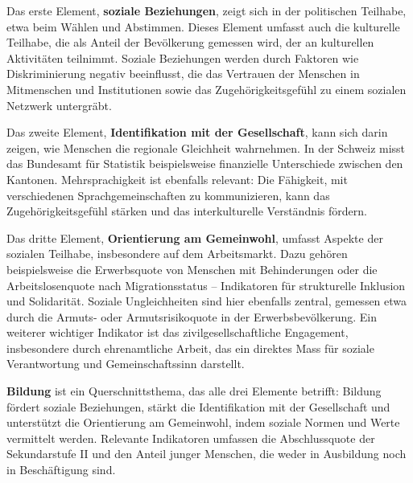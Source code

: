 \documentclass[
  nswissgerman,
  a4paper,
  DIV=11,
  numbers=noendperiod,
  oneside,
  openany]{scrreprt}
\begin{document}
Das erste Element, \textbf{soziale Beziehungen}, zeigt sich in der
politischen Teilhabe, etwa beim Wählen und Abstimmen. Dieses Element
umfasst auch die kulturelle Teilhabe, die als Anteil der Bevölkerung
gemessen wird, der an kulturellen Aktivitäten teilnimmt. Soziale
Beziehungen werden durch Faktoren wie Diskriminierung negativ
beeinflusst, die das Vertrauen der Menschen in Mitmenschen und
Institutionen sowie das Zugehörigkeitsgefühl zu einem sozialen Netzwerk
untergräbt.

Das zweite Element, \textbf{Identifikation mit der Gesellschaft}, kann
sich darin zeigen, wie Menschen die regionale Gleichheit wahrnehmen. In
der Schweiz misst das Bundesamt für Statistik beispielsweise finanzielle
Unterschiede zwischen den Kantonen. Mehrsprachigkeit ist ebenfalls
relevant: Die Fähigkeit, mit verschiedenen Sprachgemeinschaften zu
kommunizieren, kann das Zugehörigkeitsgefühl stärken und das
interkulturelle Verständnis fördern.

Das dritte Element, \textbf{Orientierung am Gemeinwohl}, umfasst Aspekte
der sozialen Teilhabe, insbesondere auf dem Arbeitsmarkt. Dazu gehören
beispielsweise die Erwerbsquote von Menschen mit Behinderungen oder die
Arbeitslosenquote nach Migrationsstatus -- Indikatoren für strukturelle
Inklusion und Solidarität. Soziale Ungleichheiten sind hier ebenfalls
zentral, gemessen etwa durch die Armuts- oder Armutsrisikoquote in der
Erwerbsbevölkerung. Ein weiterer wichtiger Indikator ist das
zivilgesellschaftliche Engagement, insbesondere durch ehrenamtliche
Arbeit, das ein direktes Mass für soziale Verantwortung und
Gemeinschaftssinn darstellt.

\textbf{Bildung} ist ein Querschnittsthema, das alle drei Elemente
betrifft: Bildung fördert soziale Beziehungen, stärkt die Identifikation
mit der Gesellschaft und unterstützt die Orientierung am Gemeinwohl,
indem soziale Normen und Werte vermittelt werden. Relevante Indikatoren
umfassen die Abschlussquote der Sekundarstufe II und den Anteil junger
Menschen, die weder in Ausbildung noch in Beschäftigung sind.

\begingroup\fontsize{8}{10}\selectfont
\end{document}
